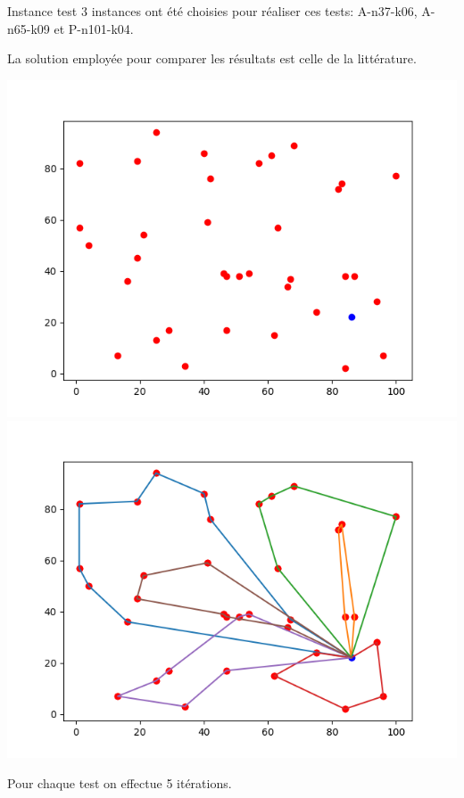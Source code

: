 \documentclass{beamer}
\begin{document}
\begin{frame}{Instance test}
3 instances ont été choisies pour réaliser ces tests: A-n37-k06, A-n65-k09 et P-n101-k04.

La solution employée pour comparer les résultats est celle de la littérature.

\includegraphics[scale=0.3]{instance3706.png}
\includegraphics[scale=0.3]{best3706.png}

Pour chaque test on effectue 5 itérations.
\end{frame}
\end{document}
